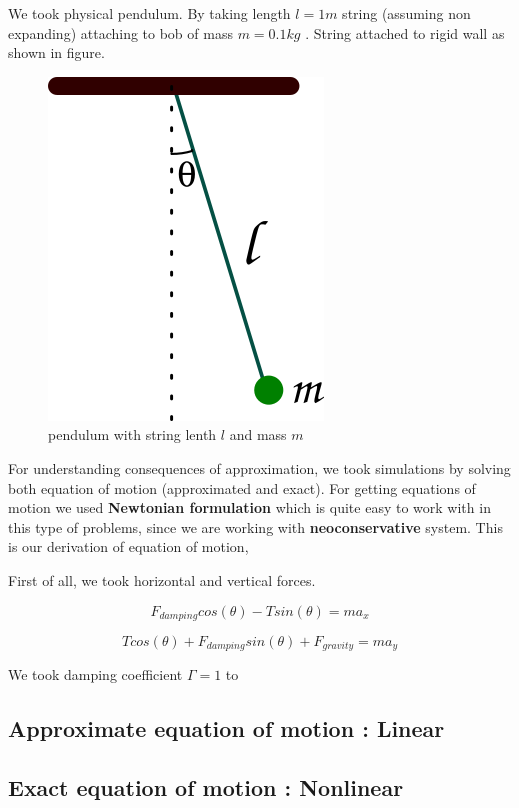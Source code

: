 \documentclass[11pt,a4paper]{article}
\begin{document}
We took physical pendulum. By taking length \(l = 1 m\) string (assuming non expanding) attaching to bob of mass \(m = 0.1 kg\) . String attached to rigid wall as shown in figure. 

\begin{figure}
\centering
\includegraphics[width=0.3 \textwidth]{./figure1.png}
\caption{\label{fig:org385783e}pendulum with string lenth \(l\) and mass \(m\)}
\end{figure}

For understanding consequences of approximation, we took simulations by solving both equation of motion (approximated and exact). For getting equations of motion we used \textbf{Newtonian formulation} which is quite easy to work with in this type of problems, since we are working with \textbf{neoconservative} system. This is our derivation of equation of motion,

First of all, we took horizontal and vertical forces.

\begin{equation}
  F_{damping}cos(\theta)-Tsin(\theta)=ma_{x}
  \label{1}
\end{equation}

\begin{equation}
  Tcos(\theta)+F_{damping}sin(\theta)+F_{gravity}=ma_{y}
  \label{2}
\end{equation}


We took damping coefficient \(\Gamma = 1\) to



\subsection{Approximate equation of motion : Linear}
\label{sec:org5d9ee29}



\subsection{Exact equation of motion : Nonlinear}
\label{sec:orgef05271}
\end{document}
